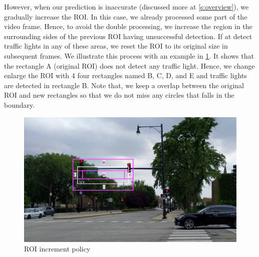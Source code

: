 However, when our prediction is inaccurate (discussed more at \ref{s:overview}), we gradually increase the ROI.
In this case, we already processed some part of the video frame. 
Hence, to avoid the double processing, we increase the region in the surrounding sides of the previous ROI having unsuccessful detection.
If at detect traffic lights in any of these areas, we reset the ROI to its original size in subsequent frames.
We illustrate this process with an example in \ref{f:rectangle}.
It shows that the rectangle A (original ROI) does not detect any traffic light.
Hence, we change enlarge the ROI with 4 four rectangles named B, C, D, and E and traffic lights are detected in rectangle B.
Note that, we keep a overlap between the original ROI and new rectangles so that we do not miss any circles that falls in the boundary. 


\begin{figure}
\centering
\includegraphics[width=5.2in]{figures/rectangle.pdf}
\caption{ROI increment policy}
\label{f:rectangle}
\end{figure}

